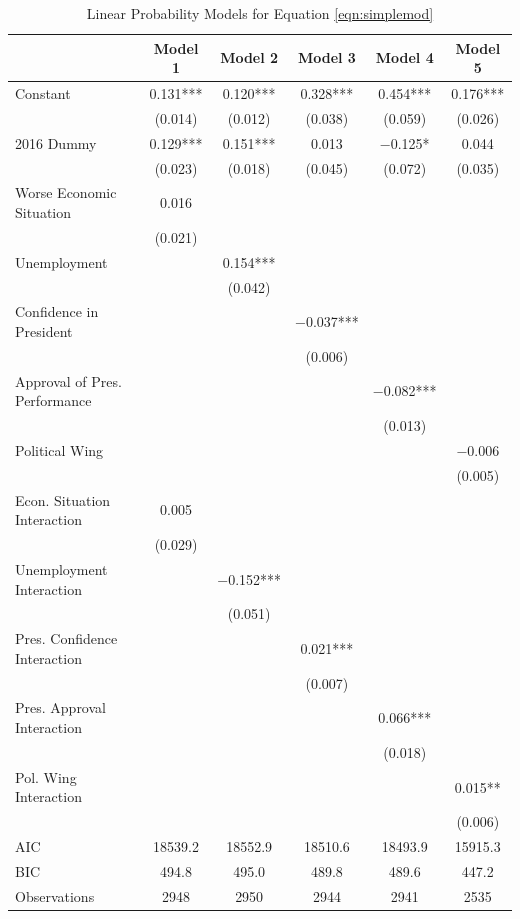\documentclass[floatsintext,man]{apa7}\usepackage[]{graphicx}\usepackage[]{color}
\begin{document}
\begin{table}[htbp]
\renewcommand{\arraystretch}{0.6}
\begin{center}
\caption{Linear Probability Models for Equation \ref{eqn:simplemod}}
\label{tab:lpmsimp}

\begin{tabular}[t]{lccccc}
\toprule
  & Model 1 & Model 2 & Model 3 & Model 4 & Model 5\\
\midrule
Constant & \num{0.131}*** & \num{0.120}*** & \num{0.328}*** & \num{0.454}*** & \num{0.176}***\\
 & (\num{0.014}) & (\num{0.012}) & (\num{0.038}) & (\num{0.059}) & (\num{0.026})\\
2016 Dummy & \num{0.129}*** & \num{0.151}*** & \num{0.013} & \num{-0.125}* & \num{0.044}\\
 & (\num{0.023}) & (\num{0.018}) & (\num{0.045}) & (\num{0.072}) & (\num{0.035})\\
Worse Economic Situation & \num{0.016} &  &  &  & \\
 & (\num{0.021}) &  &  &  & \\
Unemployment &  & \num{0.154}*** &  &  & \\
 &  & (\num{0.042}) &  &  & \\
Confidence in President &  &  & \num{-0.037}*** &  & \\
 &  &  & (\num{0.006}) &  & \\
Approval of Pres. Performance &  &  &  & \num{-0.082}*** & \\
 &  &  &  & (\num{0.013}) & \\
Political Wing &  &  &  &  & \num{-0.006}\\
 &  &  &  &  & (\num{0.005})\\
Econ. Situation Interaction & \num{0.005} &  &  &  & \\
 & (\num{0.029}) &  &  &  & \\
Unemployment Interaction &  & \num{-0.152}*** &  &  & \\
 &  & (\num{0.051}) &  &  & \\
Pres. Confidence Interaction &  &  & \num{0.021}*** &  & \\
 &  &  & (\num{0.007}) &  & \\
Pres. Approval Interaction &  &  &  & \num{0.066}*** & \\
 &  &  &  & (\num{0.018}) & \\
Pol. Wing Interaction &  &  &  &  & \num{0.015}**\\
 &  &  &  &  & (\num{0.006})\\
\midrule
AIC & \num{18539.2} & \num{18552.9} & \num{18510.6} & \num{18493.9} & \num{15915.3}\\
BIC & \num{494.8} & \num{495.0} & \num{489.8} & \num{489.6} & \num{447.2}\\
Observations & 2948 & 2950 & 2944 & 2941 & 2535\\
\bottomrule
\end{tabular}



\end{center}
\end{table}
\end{document}
